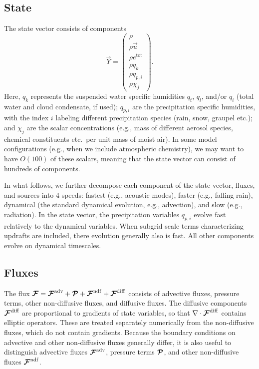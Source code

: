 \documentclass{article}
\begin{document}
{\subsection{State}

The state vector consists of components
\begin{equation}\label{e:state}
\vec{Y}=\left( \begin{array}{c}
\rho \\
\rho\vec{u} \\
\rho e^{\mathrm{tot}}\\
\rho q_k\\
\rho q_{p,i}\\
\rho \chi_j
\end{array}
\right).
\end{equation}
Here, $q_k$ represents the suspended water specific humidities $q_t$, $q_l$, and/or $q_i$ (total water and cloud condensate, if used); $q_{p,i}$ are the precipitation specific humidities, with the index $i$ labeling different precipitation species (rain, snow, graupel etc.); and $\chi_j$ are the scalar concentrations (e.g., mass of different aerosol species, chemical constituents etc.\ per unit mass of moist air). In some model configurations (e.g., when we include atmospheric chemistry), we may want to have $O(100)$ of these scalars, meaning that the state vector can consist of hundreds of components.

In what follows, we further decompose each component of the state vector, fluxes, and sources into 4 speeds: fastest (e.g., acoustic modes), faster (e.g., falling rain), dynamical (the standard dynamical evolution, e.g., advection), and slow (e.g., radiation). In the state vector, the precipitation variables $q_{p,i}$ evolve fast relatively to the dynamical variables. When subgrid scale terms characterizing updrafts are included, there evolution generally also is fast. All other components evolve on dynamical timescales.  

\subsection{Fluxes}

The flux $\boldsymbol{{\mathcal{F}}}=\boldsymbol{{\mathcal{F}}}^{\mathrm{adv}} + \boldsymbol{{\mathcal{P}}} + \boldsymbol{{\mathcal{F}}}^{\mathrm{ndf}} + \boldsymbol{{\mathcal{F}}}^{\mathrm{diff}}$ consists of advective fluxes, pressure terms, other non-diffusive fluxes, and diffusive fluxes. The diffusive components $\boldsymbol{{\mathcal{F}}}^{\mathrm{diff}}$ are proportional to gradients of state variables, so that $\nabla \cdot \boldsymbol{{\mathcal{F}}}^{\mathrm{diff}}$ contains elliptic operators. These are treated separately numerically from the non-diffusive fluxes, which do not contain gradients. Because the boundary conditions on advective and other non-diffusive fluxes generally differ, it is also useful to distinguish advective fluxes $\boldsymbol{{\mathcal{F}}}^{\mathrm{adv}}$, pressure terms $\boldsymbol{{\mathcal{P}}}$, and other non-diffusive fluxes $\boldsymbol{{\mathcal{F}}}^{\mathrm{ndf}}$. 

}
\end{document}

